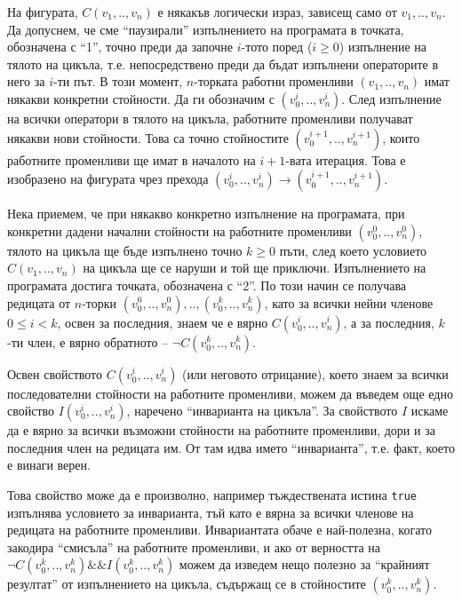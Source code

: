 \documentclass[12pt,a4paper]{article}
\newcommand{\code}[1]{\texttt{#1}}
\begin{document}
\begin{mdframed}[hidealllines=true,backgroundcolor=gray!20]
На фигурата, $C(v_1,..,v_n)$ е някакъв логически израз, зависещ само от $v_1,..,v_n$. Да допуснем, че сме ``паузирали'' изпълнението на програмата в точката, обозначена с ``1'', точно преди да започне $i$-тото поред ($i\geq 0$) изпълнение на тялото на цикъла, т.е. непосредствено преди да бъдат изпълнени операторите в него за $i$-ти път. В този момент, $n$-торката работни променливи $(v_1,..,v_n)$ имат някакви конкретни стойности. Да ги обозначим с $(v_0^{i},..,v_n^{i})$. След изпълнение на всички оператори в тялото на цикъла, работните променливи получават някакви нови стойности. Това са точно стойностите $(v_0^{i+1},..,v_n^{i+1})$, които работните променливи ще имат в началото на $i+1$-вата итерация. Това е изобразено на фигурата чрез прехода $(v_0^i,..,v_n^i) \rightarrow (v_0^{i+1},..,v_n^{i+1})$.

Нека приемем, че при някакво конкретно изпълнение на програмата, при конкретни дадени начални стойности на работните променливи  $(v_0^{0},..,v_n^{0})$, тялото на цикъла ще бъде изпълнено точно  $k\geq 0$ пъти, след което условието $C(v_1,..,v_n)$ на цикъла ще се наруши и той ще приключи. Изпълнението на програмата достига точката, обозначена с ``2''. По този начин се получава редицата от $n$-торки $(v_0^{0},..,v_n^{0}),..,(v_0^{k},..,v_n^{k})$, като за всички нейни членове $0\leq i < k$, освен за последния, знаем че е вярно $C(v_0^{i},..,v_n^{i})$, а за последния, $k$-ти член, е вярно обратното -- $\neg C(v_0^{k},..,v_n^{k})$.

Освен свойството $C(v_0^{i},..,v_n^{i})$ (или неговото отрицание), което знаем за всички последователни стойности на работните променливи, можем да въведем още едно свойство $I(v_0^{i},..,v_n^{i})$, наречено ``инварианта на цикъла''. За свойството $I$ искаме да е вярно за всички възможни стойности на работните променливи, дори и за последния член на редицата им. От там идва името ``инварианта'', т.е. факт, което е винаги верен.

Това свойство може да е произволно, например тъждествената истина \code{true} изпълнява условието за инварианта, тъй като е вярна за всички членове на редицата на работните променливи. Инвариантата обаче е най-полезна, когато закодира ``смисъла'' на работните променливи, и ако от верността на $\neg C(v_0^{k},..,v_n^{k}) \&\& I(v_0^{k},..,v_n^{k})$ можем да изведем нещо полезно за ``крайният резултат'' от изпълнението на цикъла, съдържащ се в стойностите $(v_0^{k},..,v_n^{k})$.
\end{mdframed}
\end{document}
